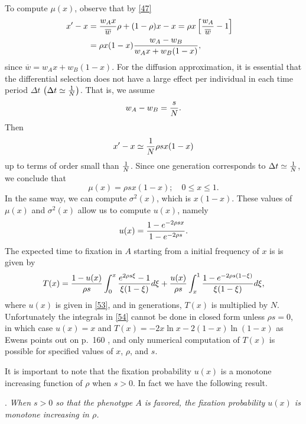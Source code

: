 \documentclass[9pt,twocolumn,twoside,lineno]{pnas-new}
\newcommand{\an}[1]{\begin{align}#1\end{align}}
\begin{document}
 To compute $\mu(x)$, observe that by \eqref{47}   
 \begin{equation}
 \an{
 x' -x &={w_Ax\over\overline w}\rho +(1-\rho)x -x =\rho x\left[{w_A\over \overline w}-1\right]\cr
 &= \rho x(1-x){w_A -w_B\over w_Ax +w_B(1-x)},}
 \label{49}\end{equation}
 since $\overline w =w_A x +w_B(1-x)$.
 For the diffusion approximation, it is essential that the differential selection does not have a large effect per individual in each time period  $\Delta t$ $\bigl(\Delta t\simeq{1\over N}\bigr)$. That is, we assume
 \begin{equation}
 w_A -w_B ={s\over N}.
 \label{50}\end{equation}
 Then
 \begin{equation}
 x'-x\simeq {1\over N}\rho sx(1-x)
 \label{51}\end{equation}
 up to terms of order small than ${1\over N}$. Since one generation corresponds to $\Delta t\simeq {1\over N}$, we  conclude that
 \begin{equation}
 \mu(x) =\rho sx(1-x);\quad 0\le x\le 1.
 \label{52}\end{equation}
 In the same way, we can compute $\sigma^2(x)$, which is $x(1-x)$. These values of $\mu(x)$ and $\sigma^2(x)$ allow us to compute $u(x)$, namely
  \begin{equation}
  u(x) ={1-e^{-2\rho sx}\over 1-e^{-2\rho s}}.
 \label{53} \end{equation}
 The expected time to fixation in $A$ starting from a initial frequency of $x$ is is given by
 \begin{equation}
 T(x)={1-u(x)\over\rho s}\int_0^x{e^{2\rho s\xi}-1\over \xi(1-\xi)}d\xi +{u(x)\over\rho s}\int_x^1{1-e^{-2\rho s(1-\xi)}\over \xi(1-\xi)}d\xi,
 \label{54}\end{equation}
 where $u(x)$ is given in \eqref{53}, and in generations, $T(x)$ is multiplied by $N$.
  Unfortunately the integrals in \eqref{54} cannot be done in closed form unless $\rho s=0$, in which case $u(x)=x$ and $T(x)=-2x\ln x -2(1-x)\ln(1-x)$ as Ewens points out on p.\ 160 \cite{ewens2004mathematical}, and only numerical computation of $T(x)$ is possible for specified values of $x$, $\rho$, and $s$.
  
  It is important to note that the fixation probability $u(x)$ is a monotone increasing function of $\rho$ when $s>0$. In fact we have the following result.
 \medskip
  
. {\sl When $s>0$ so that the phenotype $A$ is favored, the fixation probability $u(x)$ is monotone increasing in $\rho$.}\par
 \medskip
 
\end{document}

